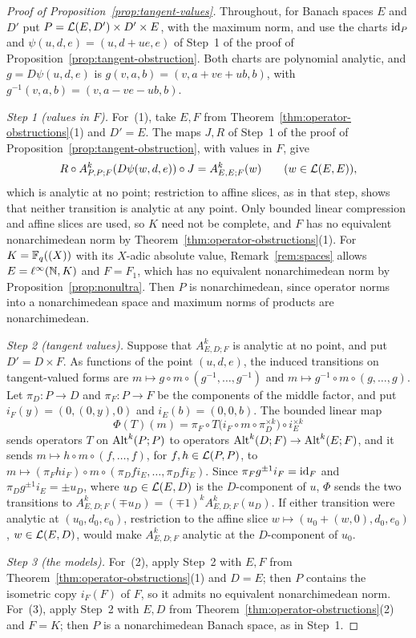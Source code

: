 \begin{proof}[Proof of Proposition~\ref{prop:tangent-values}]
Throughout, for Banach spaces $E$ and $D'$ put $P=\mathcal L(E,D')\times D'\times E$, with the maximum norm, and use the charts $\mathrm{id}_P$ and $\psi(u,d,e)=(u,d+ue,e)$ of Step~1 of the proof of Proposition~\ref{prop:tangent-obstruction}. Both charts are polynomial analytic, and $g=D\psi(u,d,e)$ is $g(v,a,b)=(v,a+ve+ub,b)$, with $g^{-1}(v,a,b)=(v,a-ve-ub,b)$.

\emph{Step 1 (values in $F$).} For~(1), take $E,F$ from Theorem~\ref{thm:operator-obstructions}(1) and $D'=E$. The maps $J,R$ of Step~1 of the proof of Proposition~\ref{prop:tangent-obstruction}, with values in $F$, give
\[
 R\circ A^k_{P,P;F}(D\psi(w,d,e))\circ J=A^k_{E,E;F}(w)\qquad(w\in\mathcal L(E,E)),
\]
which is analytic at no point; restriction to affine slices, as in that step, shows that neither transition is analytic at any point. Only bounded linear compression and affine slices are used, so $K$ need not be complete, and $F$ has no equivalent nonarchimedean norm by Theorem~\ref{thm:operator-obstructions}(1). For $K=\mathbb F_q((X))$ with its $X$\nobreakdash-adic absolute value, Remark~\ref{rem:spaces} allows $E=\ell^\infty(\mathbb N,K)$ and $F=F_1$, which has no equivalent nonarchimedean norm by Proposition~\ref{prop:nonultra}. Then $P$ is nonarchimedean, since operator norms into a nonarchimedean space and maximum norms of products are nonarchimedean.

\emph{Step 2 (tangent values).} Suppose that $A^k_{E,D;F}$ is analytic at no point, and put $D'=D\times F$. As functions of the point $(u,d,e)$, the induced transitions on tangent-valued forms are $m\mapsto g\circ m\circ(g^{-1},\ldots,g^{-1})$ and $m\mapsto g^{-1}\circ m\circ(g,\ldots,g)$. Let $\pi_D\colon P\to D$ and $\pi_F\colon P\to F$ be the components of the middle factor, and put $i_F(y)=(0,(0,y),0)$ and $i_E(b)=(0,0,b)$. The bounded linear map
\[
 \Phi(T)(m)=\pi_F\circ T\bigl(i_F\circ m\circ\pi_D^{\times k}\bigr)\circ i_E^{\times k}
\]
sends operators $T$ on $\operatorname{Alt}^k(P;P)$ to operators $\operatorname{Alt}^k(D;F)\to\operatorname{Alt}^k(E;F)$, and it sends $m\mapsto h\circ m\circ(f,\ldots,f)$, for $f,h\in\mathcal L(P,P)$, to $m\mapsto(\pi_Fhi_F)\circ m\circ(\pi_Dfi_E,\ldots,\pi_Dfi_E)$. Since $\pi_Fg^{\pm1}i_F=\mathrm{id}_F$ and $\pi_Dg^{\pm1}i_E=\pm u_D$, where $u_D\in\mathcal L(E,D)$ is the $D$\nobreakdash-component of $u$, $\Phi$ sends the two transitions to $A^k_{E,D;F}(\mp u_D)=(\mp1)^kA^k_{E,D;F}(u_D)$. If either transition were analytic at $(u_0,d_0,e_0)$, restriction to the affine slice $w\mapsto(u_0+(w,0),d_0,e_0)$, $w\in\mathcal L(E,D)$, would make $A^k_{E,D;F}$ analytic at the $D$\nobreakdash-component of $u_0$.

\emph{Step 3 (the models).} For~(2), apply Step~2 with $E,F$ from Theorem~\ref{thm:operator-obstructions}(1) and $D=E$; then $P$ contains the isometric copy $i_F(F)$ of $F$, so it admits no equivalent nonarchimedean norm. For~(3), apply Step~2 with $E,D$ from Theorem~\ref{thm:operator-obstructions}(2) and $F=K$; then $P$ is a nonarchimedean Banach space, as in Step~1.
\end{proof}

